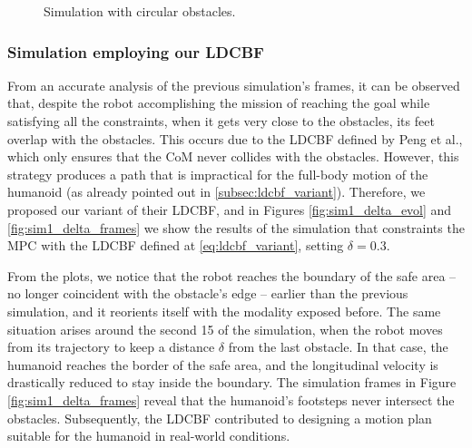 \begin{figure}[H]
\begin{subfigure}{0.35\textwidth}
    \end{subfigure}
    \caption[short]{Simulation with circular obstacles.}
    \label{fig:sim1_frames}
\end{figure}
\thispagestyle{empty}

\subsubsection{Simulation employing our LDCBF}
From an accurate analysis of the previous simulation's frames, it can be observed that, despite the robot accomplishing the mission of reaching the goal while satisfying all the constraints, when it gets very close to the obstacles, its feet overlap with the obstacles. This occurs due to the LDCBF defined by Peng et al., which only ensures that the CoM never collides with the obstacles. However, this strategy produces a path that is impractical for the full-body motion of the humanoid (as already pointed out in \ref{subsec:ldcbf_variant}). Therefore, we proposed our variant of their LDCBF, and in Figures \ref{fig:sim1_delta_evol} and \ref{fig:sim1_delta_frames} we show the results of the simulation that constraints the MPC with the LDCBF defined at \ref{eq:ldcbf_variant}, setting $\delta=0.3$.

From the plots, we notice that the robot reaches the boundary of the safe area -- no longer coincident with the obstacle's edge -- earlier than the previous simulation, and it reorients itself with the modality exposed before. The same situation arises around the second 15 of the simulation, when the robot moves from its trajectory to keep a distance $\delta$ from the last obstacle.
In that case, the humanoid reaches the border of the safe area, and the longitudinal velocity is drastically reduced to stay inside the boundary. The simulation frames in Figure \ref{fig:sim1_delta_frames} reveal that the humanoid's footsteps never intersect the obstacles. Subsequently, the LDCBF contributed to designing a motion plan suitable for the humanoid in real-world conditions.

